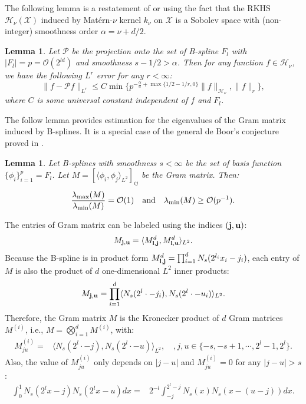 \documentclass[aos,preprint]{imsart}
\theoremstyle{plain}
\newtheorem{lemma}[theorem]{Lemma}
\newcommand{\CalO}{\mathcal O}
\newcommand{\CalH}{\mathcal H}
\newcommand{\CalX}{\mathcal X}
\newcommand{\CalP}{\mathcal P}
\theoremstyle{remark}
\begin{document}
\begin{appendix}
The following lemma is a restatement of  \cite[Theorem 1.2]{dung2011optimal} or \cite[Lemma 3.1]{dung2011adaptive} using the fact that the RKHS $\CalH_\nu(\CalX)$ induced by Mat\'ern-$\nu$ kernel $k_\nu$  on $\CalX$ is a Sobolev space with (non-integer) smoothness order $\alpha=\nu+d/2$.
\begin{lemma}
    \label{lem:spline_approx_err}
     Let $\CalP$ be the projection onto the set of B-spline $F_l$ with $|F_l|=p=\CalO(2^{ld})$ and smoothness $s-1/2>\alpha$. Then for any function $f\in\CalH_\nu$, we have the following $L^r$ error for any $r<\infty$:
    \[\| f-\CalP f\|_{L^r}\leq C \min\{p^{-\frac{\alpha}{d}+\max\{1/2-1/r,0\}}\|f\|_{\CalH_\nu},\|f\|_r\},\]
    where $C$ is some universal constant independent of $f$ and $F_l$.
\end{lemma}
The follow lemma provides estimation for the eigenvalues of the Gram matrix induced by B-splines. It is a special case of the general de Boor's conjecture proved in \cite{shadrin2001norm}.
\begin{lemma}
\label{lem:de_Boor}
    Let B-splines with smoothness $s<\infty$ be the set of basis function $\{\phi_i\}_{i=1}^p=F_l$. Let $M=[\langle \phi_i,\phi_j\rangle_{L^2}]_{ij}$ be the Gram matrix. Then:
    \[\frac{\lambda_{\rm max}(M)}{\lambda_{\rm min}(M)}=\CalO(1)\quad\text{and}\quad \lambda_{\rm min}(M)\geq \CalO(p^{-1}).\]
\end{lemma}
\proof
The entries of Gram matrix can be labeled using the indices $(\bold{j},\bold{u})$:
\[M_{\bold{j},\bold{u}}=\langle M^d_{\bold{l},\bold{j}},M^d_{\bold{l},\bold{u}}\rangle_{L^2}.\]
Because the B-spline is in product form $M^d_{\bold{l},\bold{j}}=\prod_{i=1}^dN_s(2^{l_i}x_i-j_i)$, each entry of $M$ is also the product of $d$ one-dimensional $L^2$ inner products:
\begin{align*}
    M_{\bold{j},\bold{u}}=\prod_{i=1}^d \langle N_s(2^{l}\cdot -j_i),N_s(2^{l}\cdot -u_i)\rangle_{L^2}.
\end{align*}
Therefore, the Gram matrix $M$ is the Kronecker product of $d$ Gram matrices $M^{(i)}$, i.e., $M=\bigotimes_{i=1}^dM^{(i)}$, with:
\begin{align*}
    M^{(i)}_{ju}=&\langle N_s(2^{l}\cdot -j),N_s(2^{l}\cdot -u) \rangle_{L^2},\quad,j,u\in\{-s,-s+1,\cdots,2^l-1,2^l\}.
\end{align*}
Also, the value of $M^{(i)}_{ju}$ only depends on $|j-u|$ and $M^{(i)}_{ju}=0$ for any $|j-u|>s$:
\begin{align*}
    \int_0^1  N_s(2^{l}x -j)N_s(2^{l}x -u)dx= &2^{-l}\int_{-j}^{2^l-j}N_s(x)N_s(x-(u-j))dx.
\end{align*}


\end{appendix}
\end{document}
